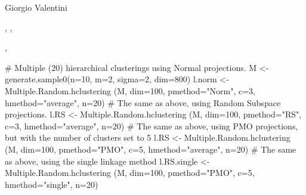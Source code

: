 \documentclass{article}
\begin{document}
\begin{Author}\relax
Giorgio Valentini 
\end{Author}
\begin{SeeAlso}\relax
{}, ,

,
\end{SeeAlso}
\begin{Examples}
\begin{ExampleCode}
# Multiple (20) hierarchical clusterings using Normal projections. 
M <- generate.sample0(n=10, m=2, sigma=2, dim=800)
l.norm <- Multiple.Random.hclustering (M, dim=100, pmethod="Norm", 
                                       c=3, hmethod="average", n=20)
# The same as above, using Random Subspace projections.
l.RS <-  Multiple.Random.hclustering (M, dim=100, pmethod="RS", c=3, 
                                      hmethod="average", n=20)
# The same as above, using PMO projections, but with the number of clusters set to 5
l.RS <-  Multiple.Random.hclustering (M, dim=100, pmethod="PMO", c=5, 
                                      hmethod="average", n=20)
# The same as above, using the single linkage method
l.RS.single <-  Multiple.Random.hclustering (M, dim=100, pmethod="PMO", 
                                             c=5, hmethod="single", n=20)
\end{ExampleCode}
\end{Examples}
\end{document}
